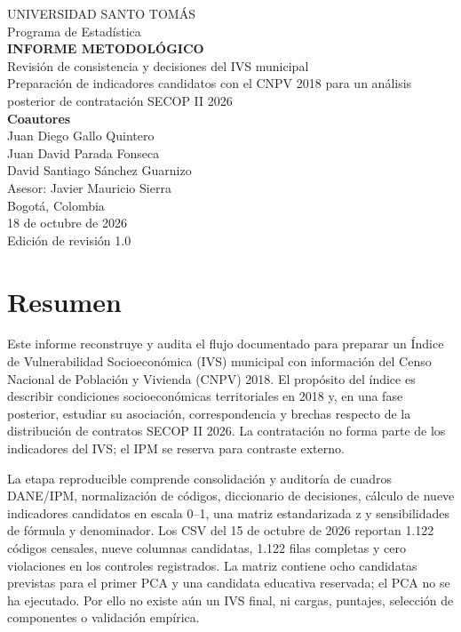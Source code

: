 \documentclass[11pt,a4paper]{article}
\begin{document}
\hypersetup{pageanchor=false}
\begin{titlepage}
\centering
\vspace*{1.4cm}
{\Large UNIVERSIDAD SANTO TOMÁS\\[0.25cm]}
{\large Programa de Estadística\\[1.1cm]}
{\LARGE\bfseries INFORME METODOLÓGICO\\[0.3cm]}
{\Large Revisión de consistencia y decisiones del IVS municipal\\[0.9cm]}
{\large Preparación de indicadores candidatos con el CNPV 2018 para un análisis posterior de contratación SECOP II 2026\\[1.1cm]}
\vfill
{\large\bfseries Coautores\\[0.3cm]}
{\large Juan Diego Gallo Quintero\\Juan David Parada Fonseca\\David Santiago Sánchez Guarnizo\\[0.65cm]}
{\large Asesor: Javier Mauricio Sierra\\[1.0cm]}
\vfill
{\large Bogotá, Colombia\\18 de octubre de 2026\\Edición de revisión 1.0}
\end{titlepage}

\hypersetup{pageanchor=true}
\section*{Resumen}

Este informe reconstruye y audita el flujo documentado para preparar un Índice de Vulnerabilidad Socioeconómica (IVS) municipal con información del Censo Nacional de Población y Vivienda (CNPV) 2018. El propósito del índice es describir condiciones socioeconómicas territoriales en 2018 y, en una fase posterior, estudiar su asociación, correspondencia y brechas respecto de la distribución de contratos SECOP II 2026. La contratación no forma parte de los indicadores del IVS; el IPM se reserva para contraste externo.

La etapa reproducible comprende consolidación y auditoría de cuadros DANE/IPM, normalización de códigos, diccionario de decisiones, cálculo de nueve indicadores candidatos en escala 0--1, una matriz estandarizada z y sensibilidades de fórmula y denominador. Los CSV del 15 de octubre de 2026 reportan 1.122 códigos censales, nueve columnas candidatas, 1.122 filas completas y cero violaciones en los controles registrados. La matriz contiene ocho candidatas previstas para el primer PCA y una candidata educativa reservada; el PCA no se ha ejecutado. Por ello no existe aún un IVS final, ni cargas, puntajes, selección de componentes o validación empírica.
\end{document}
